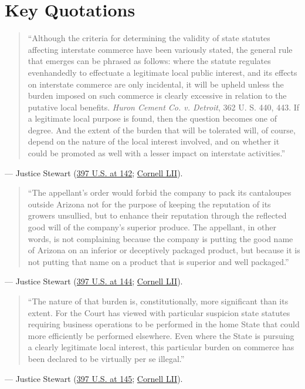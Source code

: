 \documentclass[12pt]{article}
\begin{document}
\section{Key Quotations}
\begin{quote}
``Although the criteria for determining the validity of state statutes affecting interstate commerce have been variously stated, the general rule that emerges can be phrased as follows: where the statute regulates evenhandedly to effectuate a legitimate local public interest, and its effects on interstate commerce are only incidental, it will be upheld unless the burden imposed on such commerce is clearly excessive in relation to the putative local benefits. \textit{Huron Cement Co. v. Detroit}, 362 U. S. 440, 443. If a legitimate local purpose is found, then the question becomes one of degree. And the extent of the burden that will be tolerated will, of course, depend on the nature of the local interest involved, and on whether it could be promoted as well with a lesser impact on interstate activities.''
\end{quote}
\noindent --- Justice Stewart (\href{https://supreme.justia.com/cases/federal/us/397/137/}{397 U.S. at 142}; \href{https://www.law.cornell.edu/supremecourt/text/397/137}{Cornell LII}).

\begin{quote}
``The appellant's order would forbid the company to pack its cantaloupes outside Arizona not for the purpose of keeping the reputation of its growers unsullied, but to enhance their reputation through the reflected good will of the company's superior produce. The appellant, in other words, is not complaining because the company is putting the good name of Arizona on an inferior or deceptively packaged product, but because it is not putting that name on a product that is superior and well packaged.''
\end{quote}
\noindent --- Justice Stewart (\href{https://supreme.justia.com/cases/federal/us/397/137/}{397 U.S. at 144}; \href{https://www.law.cornell.edu/supremecourt/text/397/137}{Cornell LII}).

\begin{quote}
``The nature of that burden is, constitutionally, more significant than its extent. For the Court has viewed with particular suspicion state statutes requiring business operations to be performed in the home State that could more efficiently be performed elsewhere. Even where the State is pursuing a clearly legitimate local interest, this particular burden on commerce has been declared to be virtually per se illegal.''
\end{quote}
\noindent --- Justice Stewart (\href{https://supreme.justia.com/cases/federal/us/397/137/}{397 U.S. at 145}; \href{https://www.law.cornell.edu/supremecourt/text/397/137}{Cornell LII}).
\end{document}
